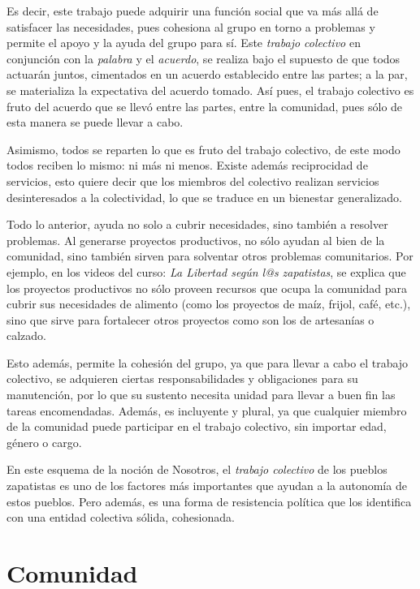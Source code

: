 \documentclass[oneside]{book}
\begin{document}
Es decir, este trabajo puede adquirir una función social que va más allá de satisfacer las necesidades, pues cohesiona al grupo en torno a problemas y permite el apoyo y la ayuda del grupo para sí. Este \textit{trabajo colectivo} en conjunción con la \textit{palabra} y el \textit{acuerdo}, se realiza bajo el supuesto de que todos actuarán juntos, cimentados en un acuerdo establecido entre las partes; a la par, se materializa la expectativa del acuerdo tomado. Así pues, el trabajo colectivo es fruto del acuerdo que se llevó entre las partes, entre la comunidad, pues sólo de esta manera se puede llevar a cabo.
	
Asimismo, todos se reparten lo que es fruto del trabajo colectivo, de este modo todos reciben lo mismo: ni más ni menos. Existe además reciprocidad de servicios, esto quiere decir que los miembros del colectivo realizan servicios desinteresados a la colectividad, lo que se traduce en un bienestar generalizado.

Todo lo anterior, ayuda no solo a cubrir necesidades, sino también a resolver problemas. Al generarse proyectos productivos, no sólo ayudan al bien de la comunidad, sino también sirven para solventar otros problemas comunitarios. Por ejemplo, en los videos del curso: \textit{La Libertad según l@s zapatistas}, se explica que los proyectos productivos no sólo proveen recursos que ocupa la comunidad para cubrir sus necesidades de alimento (como los proyectos de maíz, frijol, café, etc.), sino que sirve para fortalecer otros proyectos como son los de artesanías o calzado.

Esto además, permite la cohesión del grupo, ya que para llevar a cabo el trabajo colectivo, se adquieren ciertas responsabilidades y obligaciones para su manutención, por lo que su sustento necesita unidad para llevar a buen fin las tareas encomendadas. Además, es incluyente y plural, ya que cualquier miembro de la comunidad puede participar en el trabajo colectivo, sin importar edad, género o cargo.

En este esquema de la noción de Nosotros, el \textit{trabajo colectivo} de los pueblos zapatistas es uno de los factores más importantes que ayudan a la autonomía de estos pueblos. Pero además, es una forma de resistencia política que los identifica con una entidad colectiva sólida, cohesionada.

\section{Comunidad}
\end{document}
